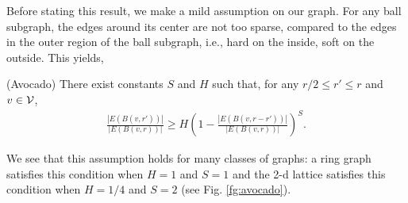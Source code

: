 Before stating this result, we make a mild assumption on our graph. 
For any ball subgraph, the edges around its center are not too sparse, compared to the edges 
in the outer region of the ball subgraph, i.e., hard on the inside, soft on the outside. This yields, 
\begin{assumption}(Avocado) There exist constants $S$ and $H$ such that, for any $r/2 \leq r' \leq r$ and $v \in \mathcal{V}$,
{\begin{align}\label{eq:lightskirt}
\frac{|E(B(v,r'))|}{|E(B(v,r))|} \geq H\left(1 - \frac{|E(B(v,r-r'))|}{|E(B(v,r))|}\right)^S.
\end{align}}
\end{assumption}
We see that this assumption holds for many classes of graphs:
a ring graph satisfies this condition when $H=1$ and $S=1$ and the 2-d lattice satisfies this condition when $H=1/4$ and $S=2$ (see Fig. \ref{fg:avocado}). 
